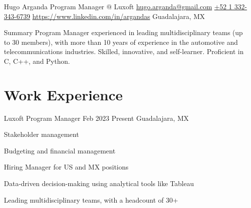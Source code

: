\documentclass{resume} %
\begin{document}

\customheader
    {Hugo Arganda}
    {Program Manager @ Luxoft}
    {\href{mailto:hugo.arganda@gmail.com}{hugo.arganda@gmail.com}}
    {\href{https://wa.me/5213323436739}{+52 1 332-343-6739}}
    {\href{https://www.linkedin.com/in/argandas}{https://www.linkedin.com/in/argandas}}
    {Guadalajara, MX}



\summary
{Summary}
    {Program Manager experienced in leading multidisciplinary teams (up to 30 members), with more than 10 years of experience in the automotive and telecommunications industries. Skilled, innovative, and self-learner. Proficient in C, C++, and Python.}



\section{Work Experience}


\job
    {Luxoft}
    {Program Manager}
    {Feb 2023}
    {Present}
    {Guadalajara, MX}
    {
    \begin{itemize-bullets}
    \item{Stakeholder management}
    \item{Budgeting and financial management}
    \item{Hiring Manager for US and MX positions}
    \item{Data-driven decision-making using analytical tools like Tableau}
    \item{Leading multidisciplinary teams, with a headcount of 30+}
    \end{itemize-bullets}
    }
\end{document}
